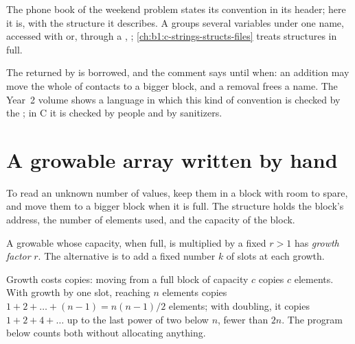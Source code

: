 The phone book of the weekend problem states its convention in its header; here it is, with the structure it
describes. A  groups several variables under one name, accessed with  or, through a ,
\code{->}; \cref{ch:b1:c-strings-structs-files} treats structures in full.

\label{lst:b1:dynamic-memory:phonebook-h}

The  returned by  is borrowed, and the comment says until when: an addition may move the whole
 of contacts to a bigger block, and a removal frees a name. The Year~2 volume shows a language in which this
kind of convention is checked by the ; in C it is checked by people and by sanitizers.

\section{A growable array written by hand}\label{sec:b1:dynamic-memory:growable}

To read an unknown number of values, keep them in a  block with room to spare, and move them to a bigger block when
it is full. The structure holds the block's address, the number of elements used, and the capacity of the block.

\label{lst:b1:dynamic-memory:intvec}

\label{out:b1:dynamic-memory:read-all}

\begin{definition}\label{def:b1:dynamic-memory:growth}
A growable  whose capacity, when full, is multiplied by a fixed $r > 1$ has \emph{growth factor} $r$. The alternative is to add a fixed number $k$ of slots at each growth.
\end{definition}

Growth costs copies: moving from a full block of capacity $c$ copies $c$ elements. With growth by one slot, reaching
$n$ elements copies $1 + 2 + \dots + (n-1) = n(n-1)/2$ elements; with doubling, it copies $1 + 2 + 4 + \dots$ up to the
last power of two below $n$, fewer than $2n$. The program below counts both without allocating anything.

